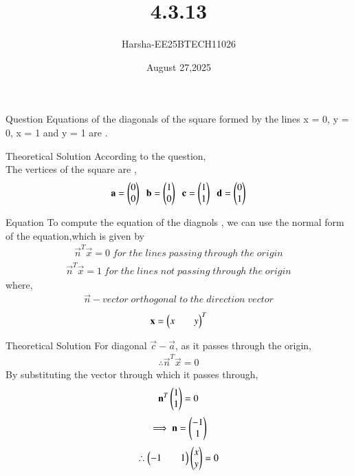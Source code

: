 \documentclass{beamer}
\title %
{4.3.13}
\date{August 27,2025}
\author %
{Harsha-EE25BTECH11026}
\begin{document}
\frame{\titlepage}
\begin{frame}{Question}
Equations of the diagonals of the square formed by the lines x = 0, y = 0, x = 1 and y = 1 are \underline{\hspace{2cm}}.
\end{frame}

\begin{frame}{Theoretical Solution}
According to the question,\\
The vertices of the square are ,
\begin{align*}
    \mathbf{a}=\begin{pmatrix}0\\0\end{pmatrix}\;\;\mathbf{b}=\begin{pmatrix}1\\0\end{pmatrix}\;\;\mathbf{c}=\begin{pmatrix}1\\1\end{pmatrix}\;\;\mathbf{d}=\begin{pmatrix}0\\1\end{pmatrix}
\end{align*}
\end{frame}

\begin{frame}{Equation}
To compute the equation of the diagnols , we can use the normal form of the equation,which is given by
\begin{align*}
    \vec{n}^T\vec{x}=0 \;for \;the \;lines \;passing\;through \;the \;origin
\end{align*}
\begin{align*}
    \vec{n}^T\vec{x}=1 \;for \;the \;lines \;not \;passing\;through \;the \;origin
\end{align*}
where,\\
\begin{align*}
    \vec{n}-vector\; orthogonal\; to\; the\; direction\; vector
\end{align*}
\begin{align*}
    \mathbf{x}=\begin{pmatrix}x&&y\end{pmatrix}^T
\end{align*}
\end{frame}

\begin{frame}{Theoretical Solution}
For diagonal $\vec{c}-\vec{a}$, as it passes through the origin,
\begin{align*}
    \therefore \vec{n}^T\vec{x}=0
\end{align*}
By substituting the vector through which it passes through,
\begin{align*}
    \mathbf{n}^T\begin{pmatrix}1\\1\end{pmatrix}=0
\end{align*}
\begin{align*}
    \implies \mathbf{n}=\begin{pmatrix}-1\\1\end{pmatrix}
\end{align*}
\begin{align*}
    \therefore \begin{pmatrix}-1&&1\end{pmatrix}\begin{pmatrix}x\\y\end{pmatrix}=0
\end{align*}
\end{frame}
\end{document}
